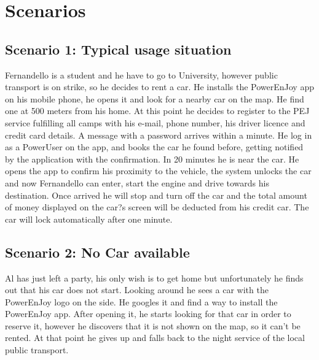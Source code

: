 \section{Scenarios}
\subsection{Scenario 1: Typical usage situation}
Fernandello is a student and he have to go to University, however public transport is on strike, so he decides to rent a car.  He installs the PowerEnJoy app on his mobile phone, he opens it and look for a nearby car on the map. He find one at 500 meters from his home. At this point he decides to register to the PEJ service fulfilling all camps with his e-mail, phone number, his driver licence and credit card details. A message with a password arrives within a minute. He log in as a PowerUser on the app, and books the car he found before, getting notified by the application with the confirmation. In 20 minutes he is near the car. He opens the app to confirm his proximity to the vehicle, the system unlocks the car and now Fernandello can enter, start the engine and drive towards his destination. Once arrived he will stop and turn off the car and the total amount of money displayed on the car?s screen will be deducted from his credit car. The car will lock automatically after one minute. 
\subsection{Scenario 2: No Car available}
Al has just left a party, his only wish is to get home but unfortunately he finds out that his car does not start. Looking around he sees a car with the PowerEnJoy logo on the side. He googles it and find a way to install the PowerEnJoy app. After opening it, he starts looking for that car in order to reserve it, however he discovers that it is not shown on the map, so it can't be rented. At that point he gives up and falls back to the night service of the local public transport.

